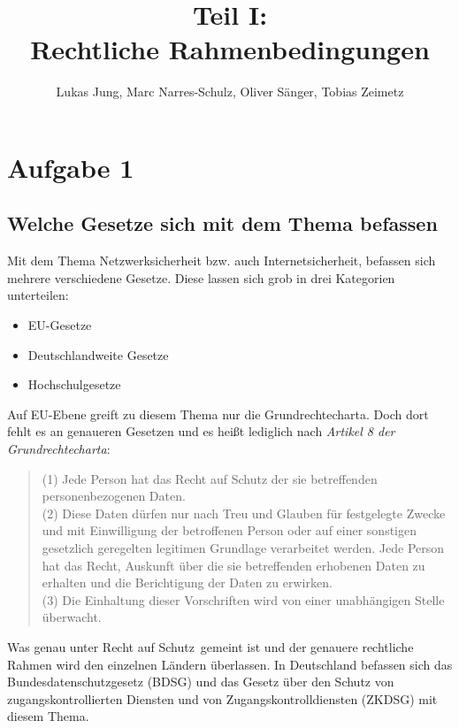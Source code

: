 \documentclass[10pt,a4paper]{article}
\author{Lukas Jung, Marc Narres-Schulz, Oliver Sänger, Tobias Zeimetz}
\title{Teil I: \\Rechtliche Rahmenbedingungen}
\begin{document}
\maketitle
\newpage

\section*{Aufgabe 1}
\subsection*{Welche Gesetze sich mit dem Thema befassen}
Mit dem Thema Netzwerksicherheit bzw. auch Internetsicherheit, befassen sich mehrere verschiedene Gesetze. Diese lassen sich grob in drei Kategorien unterteilen:
\begin{itemize}
	\item EU-Gesetze
	\item Deutschlandweite Gesetze
	\item Hochschulgesetze
\end{itemize}
Auf EU-Ebene greift zu diesem Thema nur die Grundrechtecharta. Doch dort fehlt es an genaueren Gesetzen und es heißt lediglich nach \emph{Artikel 8 der Grundrechtecharta}:
\begin{quote}
(1) Jede Person hat das Recht auf Schutz der sie betreffenden personenbezogenen Daten.\\
(2) Diese Daten dürfen nur nach Treu und Glauben für festgelegte Zwecke und mit Einwilligung
der betroffenen Person oder auf einer sonstigen gesetzlich geregelten legitimen Grundlage verarbeitet
werden. Jede Person hat das Recht, Auskunft über die sie betreffenden erhobenen Daten zu erhalten
und die Berichtigung der Daten zu erwirken.\\
(3) Die Einhaltung dieser Vorschriften wird von einer unabhängigen Stelle überwacht.
\end{quote} 
Was genau unter \glqq Recht auf Schutz\grqq \ gemeint ist und der genauere rechtliche Rahmen wird den einzelnen Ländern überlassen. In Deutschland befassen sich das Bundesdatenschutzgesetz (BDSG) und das Gesetz über den Schutz von zugangskontrollierten Diensten und von Zugangskontrolldiensten (ZKDSG) mit diesem Thema. 
\end{document}

